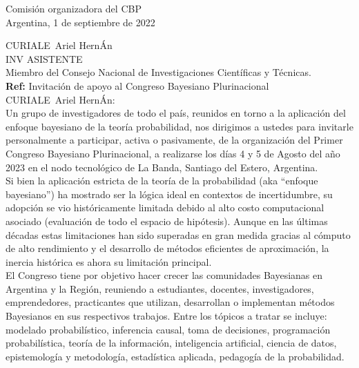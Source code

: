 \documentclass[a4paper,11pt]{article}
\begin{document}
\begin{flushright}
Comisión organizadora del CBP \\
Argentina, 1 de septiembre de 2022
\end{flushright} 

\vspace{0.1cm}
\noindent
CURIALE Ariel HernÁn\\
INV ASISTENTE \\
Miembro del Consejo Nacional de Investigaciones Científicas y Técnicas.\\[-0.1cm]

\hfill \textbf{Ref:} Invitación de apoyo al Congreso Bayesiano Plurinacional \\

\vspace{0.3cm} \noindent CURIALE Ariel HernÁn:\\

\indent Un grupo de investigadores de todo el país, reunidos en torno a la aplicación del enfoque bayesiano de la teoría probabilidad, nos dirigimos a ustedes para invitarle personalmente a participar, activa o pasivamente, de la organización del Primer Congreso Bayesiano Plurinacional, a realizarse los días 4 y 5 de Agosto del año 2023 en el nodo tecnológico de La Banda, Santiago del Estero, Argentina. \\

\indent Si bien la aplicación estricta de la teoría de la probabilidad (aka ``enfoque bayesiano'') ha mostrado ser la lógica ideal en contextos de incertidumbre, su adopción se vio históricamente limitada debido al alto costo computacional asociado (evaluación de todo el espacio de hipótesis). Aunque en las últimas décadas estas limitaciones han sido superadas en gran medida gracias al cómputo de alto rendimiento y el desarrollo de métodos eficientes de aproximación, la inercia histórica es ahora su limitación principal. \\

\indent  El Congreso tiene por objetivo hacer crecer las comunidades Bayesianas en Argentina y la Región, reuniendo a estudiantes, docentes, investigadores, emprendedores, practicantes que utilizan, desarrollan o implementan métodos Bayesianos en sus respectivos trabajos. Entre los tópicos a tratar se incluye: modelado probabilístico, inferencia causal, toma de decisiones, programación probabilística, teoría de la información, inteligencia artificial, ciencia de datos, epistemología y metodología, estadística aplicada, pedagogía de la probabilidad. \\
\end{document}
